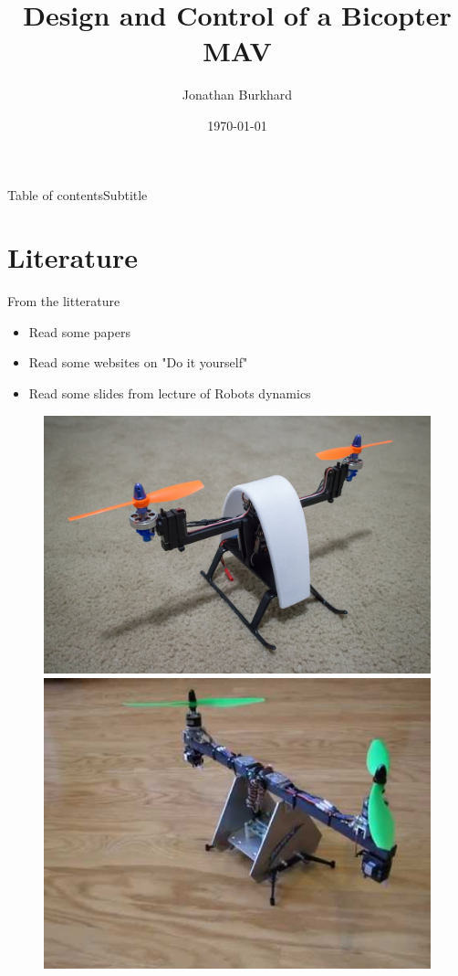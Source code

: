 \documentclass{beamer}
\author{Jonathan Burkhard}
\title{Design and Control of a Bicopter MAV}
\date{\today}
\begin{document}
\frame{\maketitle}
\begin{frame}{Table of contents}{Subtitle}
	\tableofcontents
\end{frame}

\section{Literature}
\begin{frame}{From the litterature}
\begin{itemize}
\item Read some papers 
\item Read some websites on "Do it yourself"
\item Read some slides from lecture of Robots dynamics
\end{itemize}
\begin{figure}
\includegraphics[scale=0.1]{pictures/bicopter}
\includegraphics[scale=0.2]{pictures/bicopter2}

\end{figure}
\end{frame}
\end{document}
